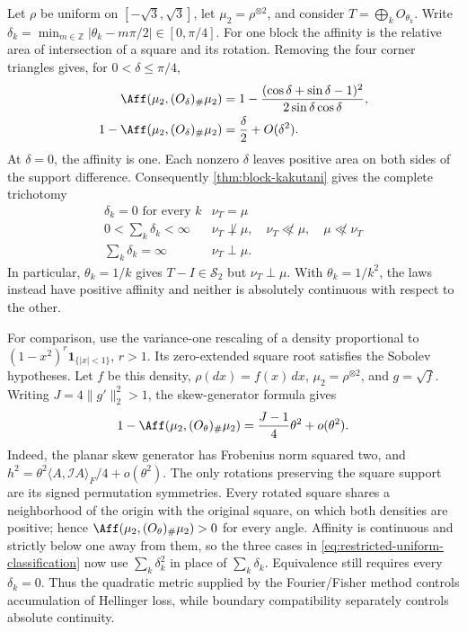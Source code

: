 Let \(\rho\) be uniform on \([-\sqrt3,\sqrt3]\), let
\(\mu_2=\rho^{\otimes2}\), and consider \(T=\bigoplus_kO_{\theta_k}\).
Write
\(\delta_k=\min_{m\in\mathbb Z}|\theta_k-m\pi/2|\in[0,\pi/4]\).
For one block the affinity is the relative area of intersection
of a square and its rotation.
Removing the four corner triangles gives, for \(0<\delta\leq\pi/4\),
\begin{equation}
 \begin{aligned}
 \Aff(\mu_2,(O_\delta)_\#\mu_2)
 &=1-\frac{(\cos\delta+\sin\delta-1)^2}
                {2\sin\delta\cos\delta},\\
 1-\Aff(\mu_2,(O_\delta)_\#\mu_2)
 &=\frac{\delta}{2}+O(\delta^2).
 \end{aligned}
 \label{eq:restricted-uniform-rotation}
\end{equation}
At \(\delta=0\), the affinity is one.  Each nonzero \(\delta\) leaves positive area on both sides of the
support difference.
Consequently \cref{thm:block-kakutani} gives the complete trichotomy
\begin{equation}
 \begin{array}{c|l}
  \delta_k=0\text{ for every }k&\nu_T=\mu\\
  0<\sum_k\delta_k<\infty&
      \nu_T\not\perp\mu,\quad \nu_T\not\ll\mu,\quad\mu\not\ll\nu_T\\
  \sum_k\delta_k=\infty&\nu_T\perp\mu.
 \end{array}
 \label{eq:restricted-uniform-classification}
\end{equation}
In particular, \(\theta_k=1/k\) gives \(T-I\in\mathcal S_2\) but
\(\nu_T\perp\mu\).
With \(\theta_k=1/k^2\), the laws instead have positive affinity
and neither is absolutely continuous with respect to the other.

For comparison, use the variance-one rescaling of a density proportional
to \((1-x^2)^r\mathbf1_{\{|x|<1\}}\), \(r>1\).
Its zero-extended square root satisfies the Sobolev hypotheses.
Let \(f\) be this density, \(\rho(dx)=f(x)\,dx\),
\(\mu_2=\rho^{\otimes2}\), and \(g=\sqrt f\).
Writing \(J=4\|g'\|_2^2>1\), the skew-generator formula gives
\begin{equation}
 1-\Aff(\mu_2,(O_\theta)_\#\mu_2)=\frac{J-1}{4}\theta^2+o(\theta^2).
 \label{eq:restricted-smooth-rotation}
\end{equation}
Indeed, the planar skew generator has Frobenius norm squared two,
and \(h^2=\theta^2\langle A,\mathcal I A\rangle_F/4+o(\theta^2)\).
The only rotations preserving the square support are its signed
permutation symmetries.
Every rotated square shares a neighborhood of the origin with the
original square, on which both densities are positive; hence
\(\Aff(\mu_2,(O_\theta)_\#\mu_2)>0\) for every angle.
Affinity is continuous and strictly below one away from them,
so the three cases in \eqref{eq:restricted-uniform-classification}
now use \(\sum_k\delta_k^2\) in place of \(\sum_k\delta_k\).
Equivalence still requires every \(\delta_k=0\).
Thus the quadratic metric supplied by the Fourier/Fisher method
controls accumulation of Hellinger loss, while boundary compatibility
separately controls absolute continuity.

